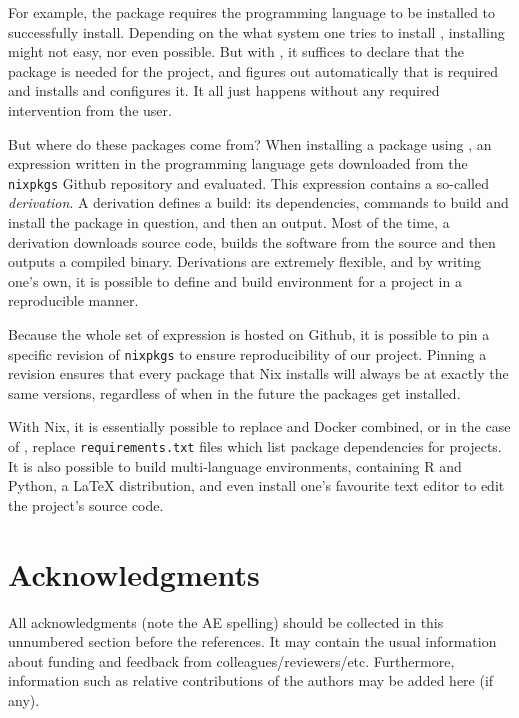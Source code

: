 \documentclass[
  article]{jss}
\begin{document}
For example, the   package requires the
 programming language to be installed to successfully
install. Depending on the what system one tries to install ,
installing  might not easy, nor even possible. But with
, it suffices to declare that the  package is
needed for the project, and  figures out automatically
that  is required and installs and configures it. It all
just happens without any required intervention from the user.

But where do these packages come from? When installing a package using
, an expression written in the  programming
language gets downloaded from the \texttt{nixpkgs} Github repository and
evaluated. This expression contains a so-called \emph{derivation}. A
derivation defines a build: its dependencies, commands to build and
install the package in question, and then an output. Most of the time, a
derivation downloads source code, builds the software from the source
and then outputs a compiled binary. Derivations are extremely flexible,
and by writing one's own, it is possible to define and build environment
for a project in a reproducible manner.

Because the whole set of  expression is hosted on Github,
it is possible to pin a specific revision of \texttt{nixpkgs} to ensure
reproducibility of our project. Pinning a revision ensures that every
package that Nix installs will always be at exactly the same versions,
regardless of when in the future the packages get installed.

With Nix, it is essentially possible to replace  and Docker
combined, or in the case of , replace
\texttt{requirements.txt} files which list package dependencies for
 projects. It is also possible to build multi-language
environments, containing R and Python, a LaTeX distribution, and even
install one's favourite text editor to edit the project's source code.

\section*{Acknowledgments}\label{acknowledgments}

\begin{tcolorbox}[enhanced jigsaw, arc=.35mm, left=2mm, toprule=.15mm, colback=white, leftrule=.75mm, breakable, rightrule=.15mm, bottomrule=.15mm, opacityback=0]

All acknowledgments (note the AE spelling) should be collected in this
unnumbered section before the references. It may contain the usual
information about funding and feedback from colleagues/reviewers/etc.
Furthermore, information such as relative contributions of the authors
may be added here (if any).

\end{tcolorbox}
\end{document}
